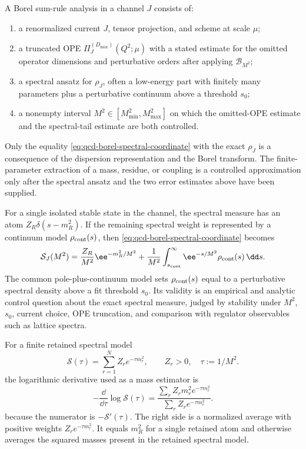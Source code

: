 \begin{controlledapproximation}
\label{ca:qcd-borel-sum-rule-window}
A Borel sum-rule analysis in a channel \(J\) consists of:
\begin{enumerate}
  \item a renormalized current \(J\), tensor projection, and scheme at scale
  \(\mu\);
  \item a truncated OPE
  \(\Pi_J^{(D_{\max})}(Q^2;\mu)\) with a stated estimate for the omitted
  operator dimensions and perturbative orders after applying
  \(\mathcal B_{M^2}\);
  \item a spectral ansatz for \(\rho_J\), often a low-energy part with finitely
  many parameters plus a perturbative continuum above a threshold \(s_0\);
  \item a nonempty interval \(M^2\in[M_{\min}^2,M_{\max}^2]\) on which the
  omitted-OPE estimate and the spectral-tail estimate are both controlled.
\end{enumerate}
Only the equality
\eqref{eq:qcd-borel-spectral-coordinate} with the exact \(\rho_J\) is a
consequence of the dispersion representation and the Borel transform.  The
finite-parameter extraction of a mass, residue, or coupling is a controlled
approximation only after the spectral ansatz and the two error estimates above
have been supplied.
\end{controlledapproximation}

For a single isolated stable state in the channel, the spectral measure has an
atom \(Z_R\delta(s-m_R^2)\).  If the remaining spectral weight is represented
by a continuum model \(\rho_{\rm cont}(s)\), then
\eqref{eq:qcd-borel-spectral-coordinate} becomes
\begin{equation}
  \mathcal S_J(M^2)
  =
  \frac{Z_R}{M^2}\ee^{-m_R^2/M^2}
  +
  \frac1{M^2}\int_{s_{\rm cont}}^\infty
  \ee^{-s/M^2}\rho_{\rm cont}(s)\,\dd s .
  \label{eq:qcd-single-pole-plus-continuum-borel}
\end{equation}
The common pole-plus-continuum model sets
\(\rho_{\rm cont}(s)\) equal to a perturbative spectral density above a
fit threshold \(s_0\).  Its validity is an empirical and analytic control
question about the exact spectral measure, judged by stability under \(M^2\),
\(s_0\), current choice, OPE truncation, and comparison with regulator
observables such as lattice spectra.

For a finite retained spectral model
\[
  \mathcal S(\tau)=\sum_{r=1}^N Z_r e^{-\tau m_r^2},
  \qquad
  Z_r>0,\quad \tau:=1/M^2 .
\]
the logarithmic derivative used as a mass estimator is
\begin{equation}
  -\frac{\dd}{\dd\tau}\log\mathcal S(\tau)
  =
  \frac{\sum_r Z_r m_r^2 e^{-\tau m_r^2}}
       {\sum_r Z_r e^{-\tau m_r^2}} .
  \label{eq:qcd-borel-effective-mass-weighted-average}
\end{equation}
because the numerator is \(-\mathcal S'(\tau)\).  The right side is a
normalized average with positive weights \(Z_r e^{-\tau m_r^2}\).  It equals
\(m_R^2\) for a single retained atom and otherwise averages the squared masses
present in the retained spectral model.


